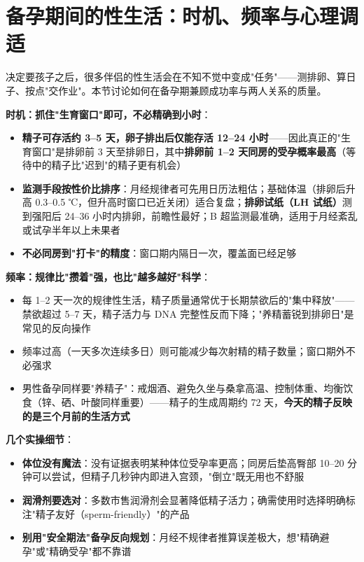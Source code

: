 \section{备孕期间的性生活：时机、频率与心理调适}

决定要孩子之后，很多伴侣的性生活会在不知不觉中变成"任务"——测排卵、算日子、按点"交作业"。本节讨论如何在备孕期兼顾成功率与两人关系的质量。

\vspace{0.5em}
\noindent\textbf{时机：抓住"生育窗口"即可，不必精确到小时}：

\begin{itemize}
	\item \textbf{精子可存活约 3--5 天，卵子排出后仅能存活 12--24 小时}——因此真正的"生育窗口"是排卵前 3 天至排卵日，其中\textbf{排卵前 1--2 天同房的受孕概率最高}（等待中的精子比"迟到"的精子更有机会）
	\item \textbf{监测手段按性价比排序}：月经规律者可先用日历法粗估；基础体温（排卵后升高 0.3--0.5 ℃，但升高时窗口已近关闭）适合复盘；\textbf{排卵试纸（LH 试纸）}测到强阳后 24--36 小时内排卵，前瞻性最好；B 超监测最准确，适用于月经紊乱或试孕半年以上未果者
	\item \textbf{不必同房到"打卡"的精度}：窗口期内隔日一次，覆盖面已经足够
\end{itemize}

\vspace{0.5em}
\noindent\textbf{频率：规律比"攒着"强，也比"越多越好"科学}：

\begin{itemize}
	\item 每 1--2 天一次的规律性生活，精子质量通常优于长期禁欲后的"集中释放"——禁欲超过 5--7 天，精子活力与 DNA 完整性反而下降；"养精蓄锐到排卵日"是常见的反向操作
	\item 频率过高（一天多次连续多日）则可能减少每次射精的精子数量；窗口期外不必强求
	\item 男性备孕同样要"养精子"：戒烟酒、避免久坐与桑拿高温、控制体重、均衡饮食（锌、硒、叶酸同样重要）——精子的生成周期约 72 天，\textbf{今天的精子反映的是三个月前的生活方式}
\end{itemize}

\vspace{0.5em}
\noindent\textbf{几个实操细节}：

\begin{itemize}
	\item \textbf{体位没有魔法}：没有证据表明某种体位受孕率更高；同房后垫高臀部 10--20 分钟可以尝试，但精子几秒钟内即进入宫颈，"倒立"既无用也不舒服
	\item \textbf{润滑剂要选对}：多数市售润滑剂会显著降低精子活力；确需使用时选择明确标注"精子友好（sperm-friendly）"的产品
	\item \textbf{别用"安全期法"备孕反向规划}：月经不规律者推算误差极大，想"精确避孕"或"精确受孕"都不靠谱
\end{itemize}

